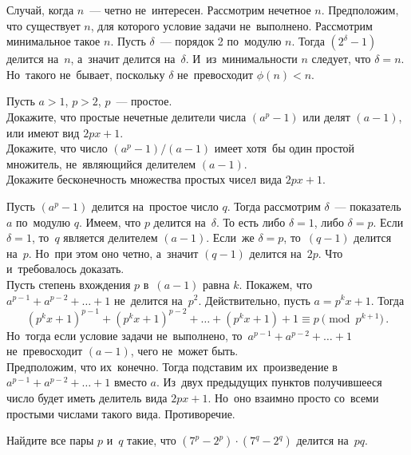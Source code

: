 \ifincludesolutions
Случай, когда $n$~--- четно не~интересен.
Рассмотрим нечетное $n$.
Предположим, что существует $n$, для которого условие задачи не~выполнено.
Рассмотрим минимальное такое $n$.
Пусть $\delta$~--- порядок 2 по~модулю $n$.
Тогда $(2^{\delta} - 1)$ делится на~$n$, а~значит делится на~$\delta$.
И~из~минимальности $n$ следует, что $\delta = n$.
Но~такого не~бывает, поскольку $\delta$ не~превосходит $\phi(n) < n$. 
\fi %

\begin{problems}

\item
Пусть $a > 1$, $p > 2$, $p$~--- простое.
\\
\sp
Докажите, что простые нечетные делители числа $(a^p - 1)$ или делят $(a - 1)$,
или имеют вид $2 p x + 1$.
\\
\sp
Докажите, что число $(a^p - 1) / (a - 1)$ имеет хотя~бы один простой
множитель, не~являющийся делителем $(a - 1)$.
\\
\sp
Докажите бесконечность множества простых чисел вида $2 p x + 1$.

\end{problems}

\ifincludesolutions
\setcounter{jeolmsubproblem}{0}%
\sp
Пусть $(a^p - 1)$ делится на~простое число $q$.
Тогда рассмотрим $\delta$~--- показатель $a$ по~модулю $q$.
Имеем, что $p$ делится на~$\delta$.
То есть либо $\delta = 1$, либо $\delta = p$.
Если $\delta = 1$, то~$q$ является делителем $(a - 1)$.
Если~же $\delta = p$, то~$(q - 1)$ делится на~$p$.
Но~при этом оно четно, а~значит $(q - 1)$ делится на~$2 p$.
Что и~требовалось доказать.
\\
\sp
Пусть степень вхождения $p$ в~$(a - 1)$ равна $k$.
Покажем, что $a^{p-1} + a^{p-2} + \ldots + 1$ не~делится на~$p^2$.
Действительно, пусть $a = p^k x + 1$.
Тогда
\[
    (p^k x + 1)^{p-1} + (p^k x + 1)^{p-2} + \ldots + (p^k x + 1) + 1
\equiv
    p
\pmod{p^{k+1}}
\,.\]
Но~тогда если условие задачи не~выполнено, то~$a^{p-1} + a^{p-2} + \ldots + 1$
не~превосходит $(a - 1)$, чего не~может быть.
\\
\sp
Предположим, что их~конечно.
Тогда подставим их~произведение в~$a^{p-1} + a^{p-2} + \ldots + 1$ вместо $a$.
Из~двух предыдущих пунктов получившееся число будет иметь делитель
вида $2 p x + 1$.
Но~оно взаимно просто со~всеми простыми числами такого вида.
Противоречие.
\fi %

\begin{problems}


\item
Найдите все пары $p$ и~$q$ такие, что $(7^{p} - 2^{p}) \cdot (7^{q} - 2^{q})$
делится на~$p q$.

\end{problems}

